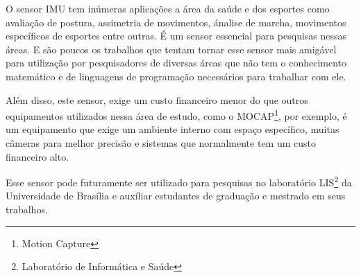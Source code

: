 O sensor IMU tem inúmeras aplicações a área da saúde e dos esportes como avaliação de postura, assimetria de movimentos, ánalise de marcha, movimentos específicos de esportes entre outras. É um sensor essencial para pesquisas nessas áreas. E são poucos os trabalhos que tentam tornar esse sensor mais amigável para utilização por pesquisadores de diversas áreas que não tem o conhecimento matemático e de linguagens de programação necessários para trabalhar com ele. 

Além disso, este sensor, exige um custo financeiro menor do que outros equipamentos utilizados nessa área de estudo, como o MOCAP\footnote{Motion Capture}, por exemplo, é um equipamento que exige um ambiente interno com espaço específico, muitas câmeras para melhor precisão e sistemas que normalmente tem um custo financeiro alto. 

Esse sensor pode futuramente ser utilizado para  pesquisas no laboratório LIS\footnote{Laboratório de Informática e Saúde} da Universidade de Brasília e auxíliar estudantes de graduação e mestrado em seus trabalhos.